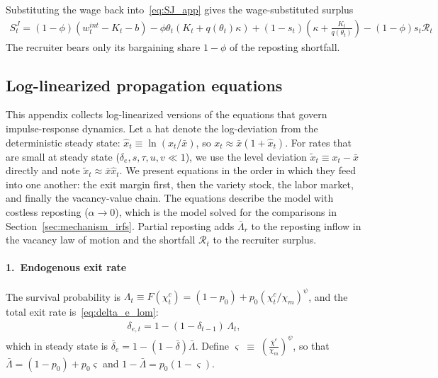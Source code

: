 \documentclass[authoryear, review, 12pt]{elsarticle}
\begin{document}
	Substituting the wage back into~\eqref{eq:SJ_app} gives the wage-substituted surplus
	\begin{align}
		S_t^J=(1-\phi)\left(w_t^{int}-K_t-b\right)-\phi\theta_t\left(K_t+q(\theta_t)\kappa\right)+(1-s_t)\left(\kappa+\frac{K_t}{q(\theta_t)}\right)-(1-\phi)s_t\mathcal{R}_t
	\end{align}
	The recruiter bears only its bargaining share $1-\phi$ of the reposting shortfall.
\subsection{Log-linearized propagation equations}
\label{app:loglin}

This appendix collects log-linearized versions of the equations that govern
impulse-response dynamics.  Let a hat denote the log-deviation from the
deterministic steady state: $\hat{x}_t \equiv \ln(x_t/\bar{x})$, so
$x_t \approx \bar{x}(1+\hat{x}_t)$.  For rates that are small at steady
state ($\delta_e, s, \tau, u, v \ll 1$), we use the level deviation
$\tilde{x}_t \equiv x_t - \bar{x}$ directly and note $\tilde{x}_t \approx
\bar{x}\hat{x}_t$.   We present equations in the order in which they feed into one
another: the exit margin first, then the variety stock, the labor market, and
finally the vacancy-value chain. The equations describe the model with
costless reposting ($\alpha\to0$), which is the model solved for the
comparisons in Section~\ref{sec:mechanism_irfs}. Partial reposting adds
$\bar\Lambda_r$ to the reposting inflow in the vacancy law of motion and the
shortfall $\mathcal{R}_t$ to the recruiter surplus.

\paragraph{1.\ Endogenous exit rate}
The survival probability is $\Lambda_t \equiv F(\chi_t^c) = (1-p_0)+p_0(\chi_t^c/\chi_m)^\psi$,
and the total exit rate is~\eqref{eq:delta_e_lom}:
\begin{align}
    \delta_{e,t} = 1-(1-\delta_{t-1})\,\Lambda_t,
\end{align}
which in steady state is $\bar\delta_e = 1-(1-\bar\delta)\bar\Lambda$.
Define
    $\varsigma \;\equiv\; \left(\frac{\bar\chi^c}{\chi_m}\right)^\psi$, so that $\bar\Lambda = (1-p_0)+p_0\varsigma$ and $1-\bar\Lambda = p_0(1-\varsigma)$.
\end{document}
